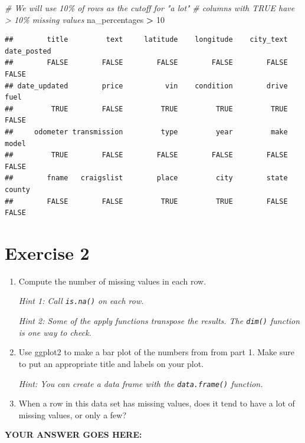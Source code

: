 \documentclass[
]{article}
\newenvironment{Shaded}{\begin{snugshade}}{\end{snugshade}}
\newcommand{\CommentTok}[1]{\textcolor[rgb]{0.56,0.35,0.01}{\textit{#1}}}
\newcommand{\DecValTok}[1]{\textcolor[rgb]{0.00,0.00,0.81}{#1}}
\newcommand{\NormalTok}[1]{#1}
\newcommand{\OperatorTok}[1]{\textcolor[rgb]{0.81,0.36,0.00}{\textbf{#1}}}
\newcommand{\StringTok}[1]{\textcolor[rgb]{0.31,0.60,0.02}{#1}}
\begin{document}
\begin{Shaded}
\begin{Highlighting}[]
\CommentTok{\# We will use 10\% of rows as the cutoff for "a lot"}
\CommentTok{\# columns with TRUE have \textgreater{} 10\% missing values}
\NormalTok{na\_percentages }\OperatorTok{\textgreater{}}\StringTok{ }\DecValTok{10}
\end{Highlighting}
\end{Shaded}

\begin{verbatim}
##        title         text     latitude    longitude    city_text  date_posted 
##        FALSE        FALSE        FALSE        FALSE        FALSE        FALSE 
## date_updated        price          vin    condition        drive         fuel 
##         TRUE        FALSE         TRUE         TRUE         TRUE        FALSE 
##     odometer transmission         type         year         make        model 
##         TRUE        FALSE        FALSE        FALSE        FALSE        FALSE 
##        fname   craigslist        place         city        state       county 
##        FALSE        FALSE         TRUE         TRUE        FALSE        FALSE
\end{verbatim}

\hypertarget{exercise-2}{%
\section{Exercise 2}\label{exercise-2}}

\begin{enumerate}
\def\labelenumi{\arabic{enumi}.}
\item
  Compute the number of missing values in each row.

  \emph{Hint 1: Call \texttt{is.na()} on each row.}

  \emph{Hint 2: Some of the apply functions transpose the results. The
  \texttt{dim()} function is one way to check.}
\item
  Use ggplot2 to make a bar plot of the numbers from from part 1. Make
  sure to put an appropriate title and labels on your plot.

  \emph{Hint: You can create a data frame with the \texttt{data.frame()}
  function.}
\item
  When a row in this data set has missing values, does it tend to have a
  lot of missing values, or only a few?
\end{enumerate}

\textbf{YOUR ANSWER GOES HERE:}
\end{document}
